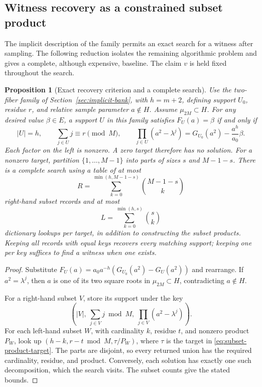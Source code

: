 \documentclass[11pt,letterpaper]{article}
\newtheorem{proposition}[theorem]{Proposition}
\theoremstyle{definition}
\theoremstyle{remark}
\begin{document}
\subsection{Witness recovery as a constrained subset product}
\label{sec:witness-search}

The implicit description of the family permits an exact search for a
witness after sampling. The following reduction isolates the remaining
algorithmic problem and gives a complete, although expensive, baseline.
The claim $v$ is held fixed throughout the search.

\begin{proposition}[Exact recovery criterion and a complete search]
\label{prop:witness-search}
Use the two-fiber family of Section~\ref{sec:implicit-bank}, with
$h=m+2$, defining support $U_0$, residue $r$, and relative sample
parameter $a\notin H$. Assume $\mu_{2M}\subset H$.
For any desired value $\beta\in E$, a support $U$ in this family
satisfies $F_U(a)=\beta$ if and only if
\begin{equation}\label{eq:subset-product-target}
 |U|=h,\qquad \sum_{j\in U}j\equiv r\pmod M,\qquad
 \prod_{j\in U}(a^2-\lambda^j)
 =G_{U_0}(a^2)-\frac{a^h}{a_0}\beta.
\end{equation}
Each factor on the left is nonzero. A zero target therefore has no
solution. For a nonzero target, partition $\{1,\ldots,M-1\}$ into
parts of sizes $s$ and $M-1-s$. There is a complete search using a
table of at most
\[
 R=\sum_{k=0}^{\min(h,M-1-s)}\binom{M-1-s}{k}
\]
right-hand subset records and at most
\[
 L=\sum_{k=0}^{\min(h,s)}\binom{s}{k}
\]
dictionary lookups per target, in addition to constructing the subset
products. Keeping all records with equal keys recovers every matching
support; keeping one per key suffices to find a witness when one exists.
\end{proposition}
\begin{proof}
Substitute
$F_U(a)=a_0a^{-h}(G_{U_0}(a^2)-G_U(a^2))$ and rearrange.
If $a^2=\lambda^j$, then $a$ is one of its two square roots in
$\mu_{2M}\subset H$, contradicting $a\notin H$.

For a right-hand subset $V$, store its support under the key
\[
 \left(|V|,\ \sum_{j\in V}j\bmod M,\
                  \prod_{j\in V}(a^2-\lambda^j)\right).
\]
For each left-hand subset $W$, with cardinality $k$, residue $t$,
and nonzero product $P_W$, look up
$(h-k,r-t\bmod M,\tau/P_W)$, where $\tau$ is the target in
\eqref{eq:subset-product-target}. The parts are disjoint, so every
returned union has the required cardinality, residue, and product.
Conversely, each solution has exactly one such decomposition, which
the search visits. The subset counts give the stated bounds.
\end{proof}
\end{document}
